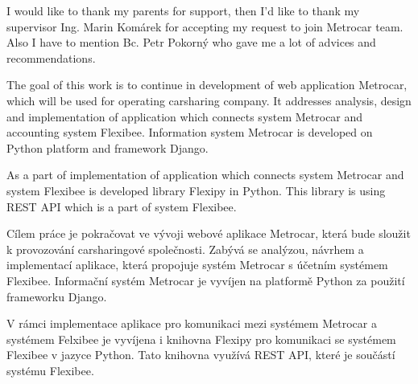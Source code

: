 \documentclass[11pt,twoside,a4paper]{book}
\begin{document}
\acknowledgements
\noindent
I would like to thank my parents for support, then I'd like to thank my supervisor Ing. Marin Komárek for 
accepting my request to join Metrocar team. Also I have to mention Bc. Petr Pokorný who gave me a lot of 
advices and recommendations.





 
\abstractpage

The goal of this work is to continue in development of web application Metrocar, which will be used for operating 
carsharing company. It addresses analysis, design and implementation of application which connects system Metrocar and 
accounting system Flexibee. Information system Metrocar is developed on Python platform and framework Django.

As a part of implementation of application which connects system Metrocar and system Flexibee is developed library Flexipy in Python.
This library is using REST API which is a part of system Flexibee.   

\baselineskip

\noindent
Cílem práce je pokračovat ve vývoji webové aplikace Metrocar, která bude sloužit k provozování carsharingové společnosti. Zabývá se 
analýzou, návrhem a implementací aplikace, která propojuje systém Metrocar s účetním systémem Flexibee. Informační systém Metrocar 
je vyvíjen na platformě Python za použití frameworku Django. 

V rámci implementace aplikace pro komunikaci mezi systémem Metrocar a 
systémem Felxibee je vyvíjena i knihovna Flexipy pro komunikaci se systémem Flexibee v jazyce Python. Tato knihovna využívá 
REST API, které je součástí systému Flexibee. 


\tableofcontents



\listoffigures


\end{document}
